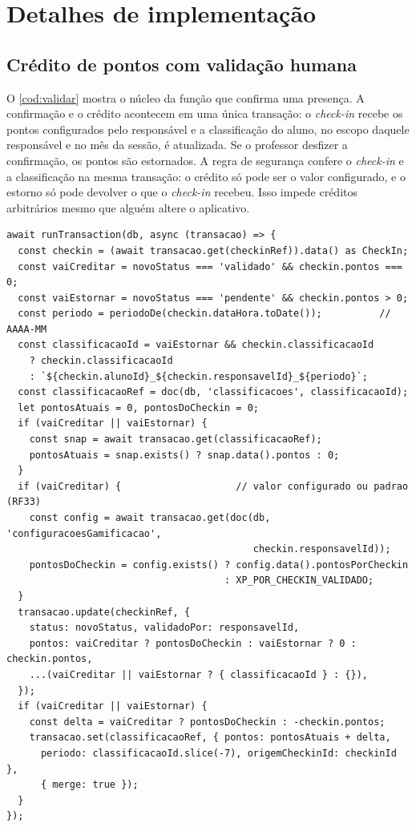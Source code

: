 \section{Detalhes de implementação}

\subsection{Crédito de pontos com validação humana}

O \autoref{cod:validar} mostra o núcleo da função que confirma uma
presença. A confirmação e o crédito acontecem em uma única transação: o
\textit{check-in} recebe os pontos configurados pelo responsável e a
classificação do aluno, no escopo daquele responsável e no mês da sessão,
é atualizada. Se o professor desfizer a confirmação, os pontos são
estornados. A regra de segurança confere o \textit{check-in} e a
classificação na mesma transação: o crédito só pode ser o valor
configurado, e o estorno só pode devolver o que o \textit{check-in}
recebeu. Isso impede créditos arbitrários mesmo que alguém altere o
aplicativo.

\begin{codigo}[!htb]
  \caption{Validação de presença e crédito de pontos (TypeScript, trecho)}
  \label{cod:validar}
\begin{lstlisting}
await runTransaction(db, async (transacao) => {
  const checkin = (await transacao.get(checkinRef)).data() as CheckIn;
  const vaiCreditar = novoStatus === 'validado' && checkin.pontos === 0;
  const vaiEstornar = novoStatus === 'pendente' && checkin.pontos > 0;
  const periodo = periodoDe(checkin.dataHora.toDate());          // AAAA-MM
  const classificacaoId = vaiEstornar && checkin.classificacaoId
    ? checkin.classificacaoId
    : `${checkin.alunoId}_${checkin.responsavelId}_${periodo}`;
  const classificacaoRef = doc(db, 'classificacoes', classificacaoId);
  let pontosAtuais = 0, pontosDoCheckin = 0;
  if (vaiCreditar || vaiEstornar) {
    const snap = await transacao.get(classificacaoRef);
    pontosAtuais = snap.exists() ? snap.data().pontos : 0;
  }
  if (vaiCreditar) {                    // valor configurado ou padrao (RF33)
    const config = await transacao.get(doc(db, 'configuracoesGamificacao',
                                           checkin.responsavelId));
    pontosDoCheckin = config.exists() ? config.data().pontosPorCheckin
                                      : XP_POR_CHECKIN_VALIDADO;
  }
  transacao.update(checkinRef, {
    status: novoStatus, validadoPor: responsavelId,
    pontos: vaiCreditar ? pontosDoCheckin : vaiEstornar ? 0 : checkin.pontos,
    ...(vaiCreditar || vaiEstornar ? { classificacaoId } : {}),
  });
  if (vaiCreditar || vaiEstornar) {
    const delta = vaiCreditar ? pontosDoCheckin : -checkin.pontos;
    transacao.set(classificacaoRef, { pontos: pontosAtuais + delta,
      periodo: classificacaoId.slice(-7), origemCheckinId: checkinId },
      { merge: true });
  }
});
\end{lstlisting}

\end{codigo}

